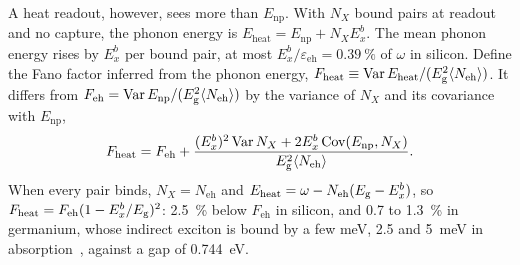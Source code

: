 A heat readout, however, sees more than $E_{\mathrm{np}}$. With $N_X$ bound pairs at readout and no capture, the phonon energy is $E_{\mathrm{heat}} = E_{\mathrm{np}} + N_XE_x^b$. The mean phonon energy rises by $E_x^b$ per bound pair, at most $E_x^b/\varepsilon_{\mathrm{eh}} = \SI{0.39}{\percent}$ of $\omega$ in silicon. Define the Fano factor inferred from the phonon energy, $F_{\mathrm{heat}} \equiv \operatorname{Var}E_{\mathrm{heat}}/(E_{\mathrm{g}}^2\langle N_{\mathrm{eh}}\rangle)$. It differs from $F_{\mathrm{eh}} = \operatorname{Var}E_{\mathrm{np}}/(E_{\mathrm{g}}^2\langle N_{\mathrm{eh}}\rangle)$ by the variance of $N_X$ and its covariance with $E_{\mathrm{np}}$,
\begin{equation}
  F_{\mathrm{heat}} = F_{\mathrm{eh}} + \frac{(E_x^b)^2\operatorname{Var}N_X + 2E_x^b\operatorname{Cov}(E_{\mathrm{np}}, N_X)}{E_{\mathrm{g}}^2\langle N_{\mathrm{eh}}\rangle} .
  \label{eq:18.5-Fheat}
\end{equation}
When every pair binds, $N_X = N_{\mathrm{eh}}$ and $E_{\mathrm{heat}} = \omega - N_{\mathrm{eh}}(E_{\mathrm{g}} - E_x^b)$, so $F_{\mathrm{heat}} = F_{\mathrm{eh}}(1 - E_x^b/E_{\mathrm{g}})^2$: \SI{2.5}{\percent} below $F_{\mathrm{eh}}$ in silicon, and 0.7 to \SI{1.3}{\percent} in germanium, whose indirect exciton is bound by a few meV, 2.5 and \SI{5}{meV} in absorption~\cite{zwerdling1959exciton,macfarlane1957fine}, against a gap of \SI{0.744}{eV}.

